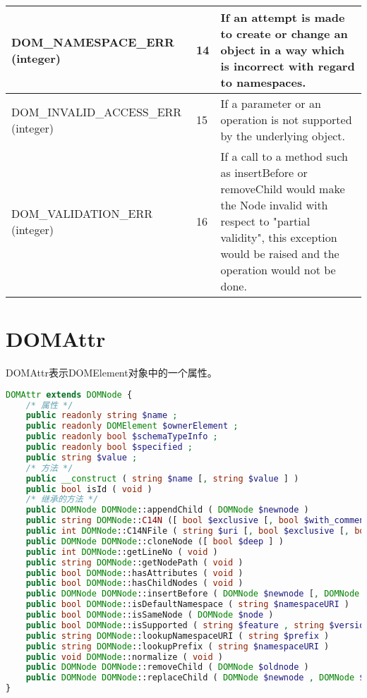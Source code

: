 \begin{longtable}{|m{150pt}|m{40pt}|m{200pt}|}
\hline
DOM\_NAMESPACE\_ERR (integer)			&14	&If an attempt is made to create or change an object in a way which is incorrect with regard to namespaces.\\
\hline
DOM\_INVALID\_ACCESS\_ERR (integer)		&15	&If a parameter or an operation is not supported by the underlying object.\\
\hline
DOM\_VALIDATION\_ERR (integer)			&16	&If a call to a method such as insertBefore or removeChild would make the Node invalid with respect to "partial validity", this exception would be raised and the operation would not be done.\\
\hline
\end{longtable}



\section{DOMAttr}


DOMAttr表示DOMElement对象中的一个属性。


\begin{lstlisting}[language=PHP]
DOMAttr extends DOMNode {
    /* 属性 */
    public readonly string $name ;
    public readonly DOMElement $ownerElement ;
    public readonly bool $schemaTypeInfo ;
    public readonly bool $specified ;
    public string $value ;
    /* 方法 */
    public __construct ( string $name [, string $value ] )
    public bool isId ( void )
    /* 继承的方法 */
    public DOMNode DOMNode::appendChild ( DOMNode $newnode )
    public string DOMNode::C14N ([ bool $exclusive [, bool $with_comments [, array $xpath [, array $ns_prefixes ]]]] )
    public int DOMNode::C14NFile ( string $uri [, bool $exclusive [, bool $with_comments [, array $xpath [, array $ns_prefixes ]]]] )
    public DOMNode DOMNode::cloneNode ([ bool $deep ] )
    public int DOMNode::getLineNo ( void )
    public string DOMNode::getNodePath ( void )
    public bool DOMNode::hasAttributes ( void )
    public bool DOMNode::hasChildNodes ( void )
    public DOMNode DOMNode::insertBefore ( DOMNode $newnode [, DOMNode $refnode ] )
    public bool DOMNode::isDefaultNamespace ( string $namespaceURI )
    public bool DOMNode::isSameNode ( DOMNode $node )
    public bool DOMNode::isSupported ( string $feature , string $version )
    public string DOMNode::lookupNamespaceURI ( string $prefix )
    public string DOMNode::lookupPrefix ( string $namespaceURI )
    public void DOMNode::normalize ( void )
    public DOMNode DOMNode::removeChild ( DOMNode $oldnode )
    public DOMNode DOMNode::replaceChild ( DOMNode $newnode , DOMNode $oldnode )
}
\end{lstlisting}


